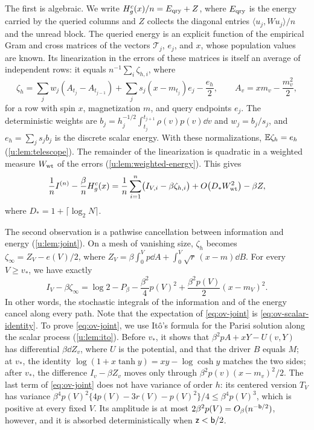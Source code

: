 The first is algebraic. We write $H^c_g(x)/n=E_{\rm qry}+Z$, where $E_{\rm qry}$
is the energy carried by the queried columns and $Z$ collects the diagonal
entries $\langle u_j,Wu_j\rangle/n$ and the unread block. The queried energy is
an explicit function of the empirical Gram and cross matrices of the vectors
$\mathcal T_j$, $e_j$, and $x$, whose population values are known. Its
linearization in the errors of these matrices is itself an average of
independent rows: it equals $n^{-1}\sum_i\zeta_{h,i}$, where
\[
 \zeta_h=\sum_jw_j(A_{t_j}-A_{t_{j-1}})+\sum_js_j(x-m_{t_j})e_j-\frac{e_h}2,
 \qquad A_v=xm_v-\frac{m_v^2}2,
\]
for a row with spin $x$, magnetization $m$, and query endpoints $e_j$. The
deterministic weights are
$b_j=h_j^{-1/2}\int_{t_j}^{t_{j+1}}\rho(v)p(v)\dd v$ and $w_j=b_j/s_j$,
and $e_h=\sum_js_jb_j$ is the discrete scalar energy. With these
normalizations, $\mathbb E\zeta_h=e_h$ (\cref{u:lem:telescope}). The remainder of the linearization is quadratic in a
weighted measure $W_{\rm wt}$ of the errors (\cref{u:lem:weighted-energy}).
This gives
\[
 \frac1nI^{(n)}-\frac\beta nH^c_g(x)
 =\frac1n\sum_{i=1}^n\bigl(I_{V,i}-\beta\zeta_{h,i}\bigr)
 +O\bigl(D_*W_{\rm wt}^2\bigr)-\beta Z,
\]
where $D_*=1+\lceil\log_2N\rceil$.

The second observation is a pathwise cancellation between information and
energy (\cref{u:lem:joint}). On a mesh of vanishing size, $\zeta_h$ becomes
$\zeta_\infty=Z_V-e(V)/2$, where
$Z_V=\beta\int_0^Vp\dd A+\int_0^V\sqrt r\,(x-m)\dd B$. For every $V\ge v_*$,
we have exactly
\begin{equation}\label{eq:ov-joint}
 I_V-\beta\zeta_\infty=\log2-P_\beta-\frac{\beta^2}4p(V)^2
 +\frac{\beta^2p(V)}2(x-m_V)^2 .
\end{equation}
In other words, the stochastic integrals of the information and of the
energy cancel along every path. Note that the expectation of
\eqref{eq:ov-joint} is \eqref{eq:ov-scalar-identity}. To prove \eqref{eq:ov-joint}, we use It\^o's
formula for the Parisi solution along the scalar process
(\cref{u:lem:ito}). Before $v_*$, it shows that
$\beta^2pA+xY-U(v,Y)$ has differential $\beta\dd Z_v$, where $U$ is the
potential, and that the driver $B$ equals $M$; at $v_*$, the identity
$\log(1+x\tanh y)=xy-\log\cosh y$ matches the two sides; after $v_*$, the
difference $I_v-\beta Z_v$ moves only through $\beta^2p(v)(x-m_v)^2/2$. The
last term of \eqref{eq:ov-joint} does not have variance of order $h$: its
centered version $T_V$ has variance
$\beta^4p(V)^2\{4p(V)-3r(V)-p(V)^2\}/4\le\beta^4p(V)^3$, which is positive at
every fixed $V$. Its amplitude is at most $2\beta^2p(V)=O_\beta(n^{-\mathsf{b}/2})$,
however, and it is absorbed deterministically when $\mathsf{z}<\mathsf{b}/2$.

